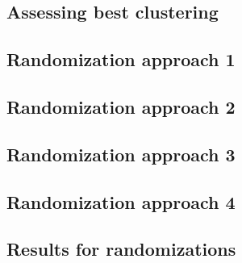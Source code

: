 \documentclass[a4paper,10pt]{article}
\begin{document}
\subsection{Assessing best clustering}

\subsection{Randomization approach 1}

\subsection{Randomization approach 2}

\subsection{Randomization approach 3}

\subsection{Randomization approach 4}

\subsection{Results for randomizations}
\end{document}
